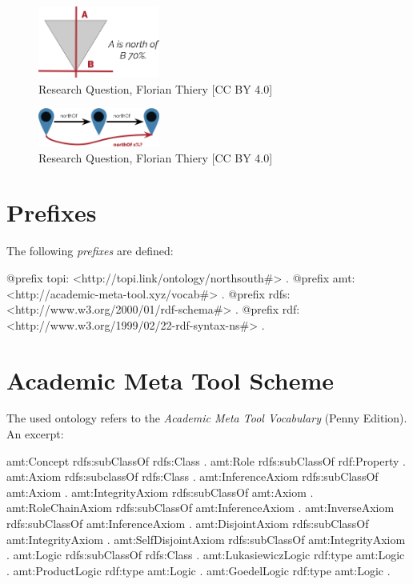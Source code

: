 \documentclass[twocolumn]{autart}
\begin{document}
\begin{figure}[!htb]
\begin{center}
\includegraphics[width=4cm]{question.png}
\caption{Research Question, Florian Thiery [CC BY 4.0]}
\label{rq1}
\end{center}
\end{figure}

\begin{figure}[!htb]
\begin{center}
\includegraphics[width=4cm]{question2.png}
\caption{Research Question, Florian Thiery [CC BY 4.0]}
\label{rq2}
\end{center}
\end{figure}

\section{Prefixes}

The following \textit{prefixes} are defined:

\begin{verbnobox}
@prefix topi: <http://topi.link/ontology/northsouth#> .
@prefix amt: <http://academic-meta-tool.xyz/vocab#> .
@prefix rdfs: <http://www.w3.org/2000/01/rdf-schema#> .
@prefix rdf: <http://www.w3.org/1999/02/22-rdf-syntax-ns#> .
\end{verbnobox}

\section{Academic Meta Tool Scheme}

The used ontology refers to the \textit{Academic Meta Tool Vocabulary} (Penny Edition)\cite{thiery_academic_2018}. An excerpt:

\begin{verbnobox}
amt:Concept rdfs:subClassOf rdfs:Class .
amt:Role rdfs:subClassOf rdf:Property .
amt:Axiom rdfs:subclassOf rdfs:Class .
amt:InferenceAxiom rdfs:subClassOf amt:Axiom .
amt:IntegrityAxiom rdfs:subClassOf amt:Axiom .
amt:RoleChainAxiom rdfs:subClassOf amt:InferenceAxiom .
amt:InverseAxiom rdfs:subClassOf amt:InferenceAxiom .
amt:DisjointAxiom rdfs:subClassOf amt:IntegrityAxiom .
amt:SelfDisjointAxiom rdfs:subClassOf amt:IntegrityAxiom .
amt:Logic rdfs:subClassOf rdfs:Class .
amt:LukasiewiczLogic rdf:type amt:Logic .
amt:ProductLogic rdf:type amt:Logic .
amt:GoedelLogic rdf:type amt:Logic . 
\end{verbnobox}
\end{document}
